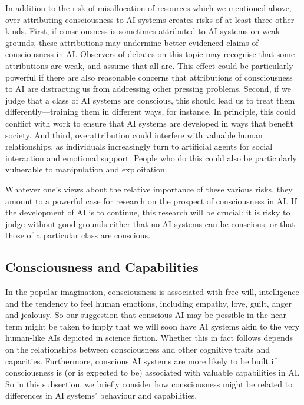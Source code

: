 \documentclass[12pt]{article}
\begin{document}
In addition to the risk of misallocation of resources which we mentioned above, over-attributing consciousness to AI systems creates risks of at least three other kinds. First, if consciousness is sometimes attributed to AI systems on weak grounds, these attributions may undermine better-evidenced claims of consciousness in AI. Observers of debates on this topic may recognise that some attributions are weak, and assume that all are. This effect could be particularly powerful if there are also reasonable concerns that attributions of consciousness to AI are distracting us from addressing other pressing problems. Second, if we judge that a class of AI systems are conscious, this should lead us to treat them differently—training them in different ways, for instance. In principle, this could conflict with work to ensure that AI systems are developed in ways that benefit society. And third, overattribution could interfere with valuable human relationships, as individuals increasingly turn to artificial agents for social interaction and emotional support. People who do this could also be particularly vulnerable to manipulation and exploitation.

Whatever one’s views about the relative importance of these various risks, they amount to a powerful case for research on the prospect of consciousness in AI. If the development of AI is to continue, this research will be crucial: it is risky to judge without good grounds either that no AI systems can be conscious, or that those of a particular class are conscious.

\subsection{Consciousness and Capabilities}

In the popular imagination, consciousness is associated with free will, intelligence and the tendency to feel human emotions, including empathy, love, guilt, anger and jealousy. So our suggestion that conscious AI may be possible in the near-term might be taken to imply that we will soon have AI systems akin to the very human-like AIs depicted in science fiction. Whether this in fact follows depends on the relationships between consciousness and other cognitive traits and capacities. Furthermore, conscious AI systems are more likely to be built if consciousness is (or is expected to be) associated with valuable capabilities in AI. So in this subsection, we briefly consider how consciousness might be related to differences in AI systems’ behaviour and capabilities.
\end{document}
